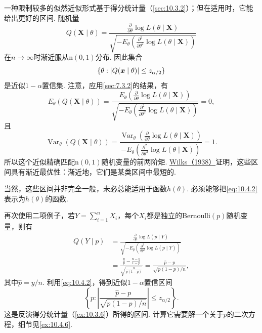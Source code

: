 一种限制较多的似然近似形式基于得分统计量（\autoref{sec:10.3.2}）；但在适用时，它能给出更好的区间. 随机量
\begin{equation}\label{eq:10.4.1}
Q(\boldsymbol X\mid\theta)=\frac{\frac\partial{\partial\theta}\log L(\theta\mid\boldsymbol X)}{\sqrt{-E_\theta\left(\frac{\partial^2}{\partial\theta^2}\log L(\theta\mid\boldsymbol X)\right)}}
\end{equation}
在$n\to\infty$时渐近服从$\mathrm n(0,1)$分布. 因此集合
\begin{equation}\label{eq:10.4.2}\index{SI0139@最大似然}
\{\theta:|Q(\boldsymbol x\mid\theta)|\leq z_{\alpha/2}\}
\end{equation}
是近似$1-\alpha$置信集. 注意，应用\autoref{sec:7.3.2}的结果，有
$$E_\theta(Q(\boldsymbol X\mid\theta))=\frac{E_\theta\left(\frac\partial{\partial\theta}\log L(\theta\mid\boldsymbol X)\right)}{\sqrt{-E_\theta\left(\frac{\partial^2}{\partial\theta^2}\log L(\theta\mid\boldsymbol X)\right)}}=0,$$
且
\begin{equation}\label{eq:10.4.3}
\operatorname{Var}_\theta(Q(\boldsymbol X\mid\theta))=\frac{\operatorname{Var}_\theta\left(\frac\partial{\partial\theta}\log L(\theta\mid\boldsymbol X)\right)}{-E_\theta\left(\frac{\partial^2}{\partial\theta^2}\log L(\theta\mid\boldsymbol X)\right)}=1.
\end{equation}
所以这个近似精确匹配$\mathrm n(0,1)$随机变量的前两阶矩. \hyperref[bib:source330]{Wilks（1938）}证明，这些区间具有渐近最优性：渐近地，它们是某类区间中最短的.

当然，这些区间并非完全一般，未必总能适用于函数$h(\theta)$. 必须能够把\eqref{eq:10.4.2}表示为$h(\theta)$的函数.

\begin{example}[二项得分区间]\label{ex:10.4.2}
再次使用二项例子，若$Y=\sum_{i=1}^nX_i$，每个$X_i$都是独立的Bernoulli$(p)$随机变量，则有
$$\begin{aligned}
Q(Y\mid p)&=\frac{\frac\partial{\partial p}\log L(p\mid Y)}{\sqrt{-E_p\left(\frac{\partial^2}{\partial p^2}\log L(p\mid Y)\right)}}\\
&=\frac{\frac yp-\frac{n-y}{1-p}}{\sqrt{\frac n{p(1-p)}}}
=\frac{\hat p-p}{\sqrt{p(1-p)/n}},
\end{aligned}$$
其中$\hat p=y/n$. 利用\eqref{eq:10.4.2}，得到近似$1-\alpha$置信区间
\begin{equation}\label{eq:10.4.4}
\left\{p:\left|\frac{\hat p-p}{\sqrt{p(1-p)/n}}\right|\leq z_{\alpha/2}\right\}.
\end{equation}
这是反演得分统计量（\autoref{ex:10.3.6}）所得的区间. 计算它需要解一个关于$p$的二次方程，细节见\autoref{ex:10.4.6}.
\end{example}

